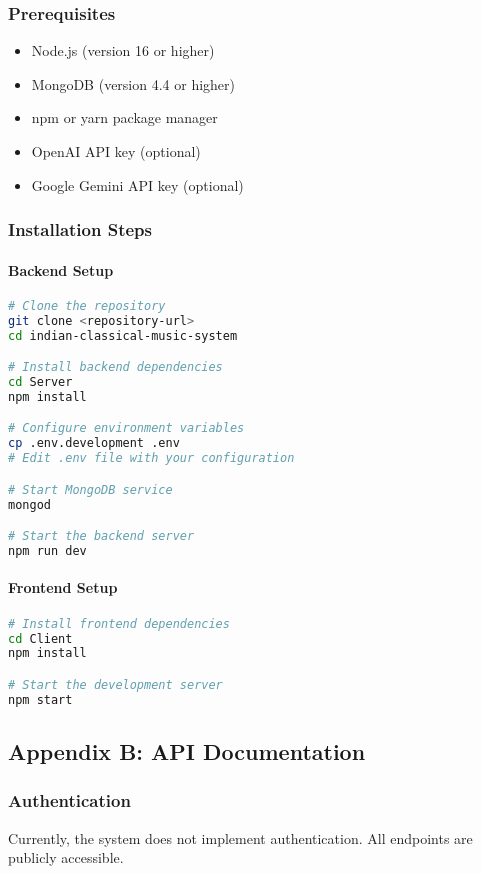 \documentclass[12pt,a4paper]{article}
\begin{document}
\subsubsection{Prerequisites}
\begin{itemize}
    \item Node.js (version 16 or higher)
    \item MongoDB (version 4.4 or higher)
    \item npm or yarn package manager
    \item OpenAI API key (optional)
    \item Google Gemini API key (optional)
\end{itemize}

\subsubsection{Installation Steps}

\paragraph{Backend Setup}
\begin{lstlisting}[language=bash]
# Clone the repository
git clone <repository-url>
cd indian-classical-music-system

# Install backend dependencies
cd Server
npm install

# Configure environment variables
cp .env.development .env
# Edit .env file with your configuration

# Start MongoDB service
mongod

# Start the backend server
npm run dev
\end{lstlisting}

\paragraph{Frontend Setup}
\begin{lstlisting}[language=bash]
# Install frontend dependencies
cd Client
npm install

# Start the development server
npm start
\end{lstlisting}

\subsection{Appendix B: API Documentation}

\subsubsection{Authentication}
Currently, the system does not implement authentication. All endpoints are publicly accessible.
\end{document}
